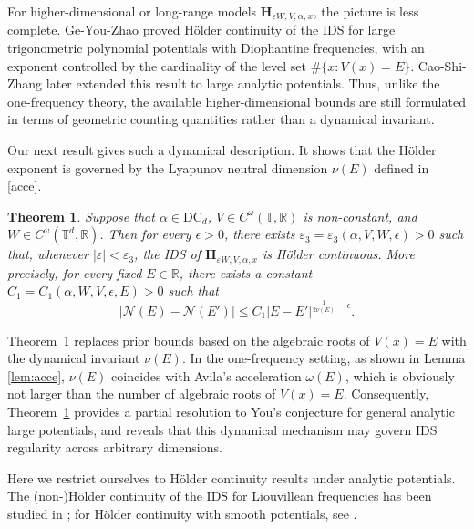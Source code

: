 \documentclass[reqno,11pt]{amsart}
\newtheorem{theorem}{Theorem}[section]
\newcommand{\R}{{\mathbb R}}
\newcommand{\T}{{\mathbb T}}
\begin{document}
For higher-dimensional or long-range models $\mathbf{H}_{\varepsilon W,V,\alpha,x}$, the picture is less complete. Ge-You-Zhao \cite{GYZ22} proved H\"older continuity of the IDS for large trigonometric polynomial potentials with Diophantine frequencies, with an exponent controlled by the cardinality of the level set $\#\{x:V(x)=E\}$. Cao-Shi-Zhang \cite{CSZ} later extended this result to 
 large analytic potentials. 
 Thus, unlike the one-frequency theory, the available higher-dimensional bounds are still formulated in terms of geometric counting quantities rather than a dynamical invariant.

Our next result gives such a dynamical description. It shows that the H\"older exponent is governed by the Lyapunov neutral dimension $\nu(E)$ defined in \eqref{acce}.

\begin{theorem}\label{thm:IDSholder}
Suppose that $\alpha\in \mathrm{DC}_d$, $V\in C^{\omega}(\T,\R)$ is non-constant, and $W\in C^{\omega}(\T^d,\R)$.  Then for every $\epsilon>0$, there exists $\varepsilon_3=\varepsilon_3(\alpha,V,W,\epsilon)>0$ such that, whenever $|\varepsilon|<\varepsilon_3$, the IDS of $\mathbf{H}_{\varepsilon W,V,\alpha,x}$ is H\"older continuous. More precisely, for every fixed $E\in\mathbb R$, there exists a constant $C_1=C_1(\alpha,W,V,\epsilon,E)>0$ such that
$$
|\mathcal N(E)-\mathcal N(E')|
\le C_1 |E-E'|^{\frac{1}{2\nu(E)}-\epsilon}.
$$
\end{theorem}

Theorem~\ref{thm:IDSholder} replaces prior bounds based on the algebraic roots of $V(x)=E$ with the dynamical invariant $\nu(E)$. In the one-frequency setting, as shown in  Lemma \ref{lem:acce}, $\nu(E)$ coincides with Avila's acceleration $\omega(E)$, which is obviously not larger than the number of algebraic roots of $V(x)=E$. Consequently, Theorem~\ref{thm:IDSholder} provides a partial resolution to You's conjecture \cite{You} for general analytic large potentials, and reveals that this  dynamical mechanism may govern IDS regularity across arbitrary dimensions.

Here we restrict ourselves to H\"older continuity results under analytic potentials. The (non‑)H\"older continuity of the IDS for Liouvillean frequencies has been studied in \cite{ALSZ,HS2,HZ,LY,YZ}; for H\"older continuity with smooth potentials, see \cite{CSZ,CSZ23,LWY,XGW}.
\end{document}
